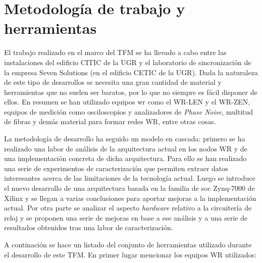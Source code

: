 \section{Metodología de trabajo y herramientas} \label{cap:herram}

El trabajo realizado en el marco del TFM se ha llevado a cabo entre las 
instalaciones del edificio CITIC de la UGR y el laboratorio de sincronización 
de la empresa Seven Solutions (en el edificio CETIC de la UGR). Dada la 
naturaleza de este tipo de desarrollos se necesita una gran cantidad de 
material y herramientas que no suelen ser baratos, por lo que no siempre es 
fácil disponer de ellos. En resumen se han utilizado equipos \gls{wr} como el 
WR-LEN y el WR-ZEN, equipos de medición como osciloscopios y analizadores de 
\textit{Phase Noise}, multitud de fibras y demás material para formar redes WR, 
entre otras cosas.

La metodología de desarrollo ha seguido un modelo en cascada: primero se ha 
realizado una labor de análisis de la arquitectura actual en los nodos WR y de 
una implementación concreta de dicha arquitectura. Para ello se han realizado 
una serie de experimentos de caracterización que permiten extraer datos 
interesantes acerca de las limitaciones de la tecnología actual. Luego se 
introduce el nuevo desarrollo de una arquitectura basada en la familia de 
\gls{soc} Zynq-7000 de Xilinx y se llegan a varias 
conclusiones para aportar mejoras a la implementación actual. Por otra parte se 
analizar el aspecto \textit{hardware} relativo a la circuitería de reloj y se 
proponen una serie de mejoras en base a ese análisis y a una serie de 
resultados obtenidos tras una labor de caracterización. 

A continación se hace un listado del conjunto de herramientas utilizado durante 
el desarrollo de este TFM. En primer lugar mencionar los equipos WR utilizados:

